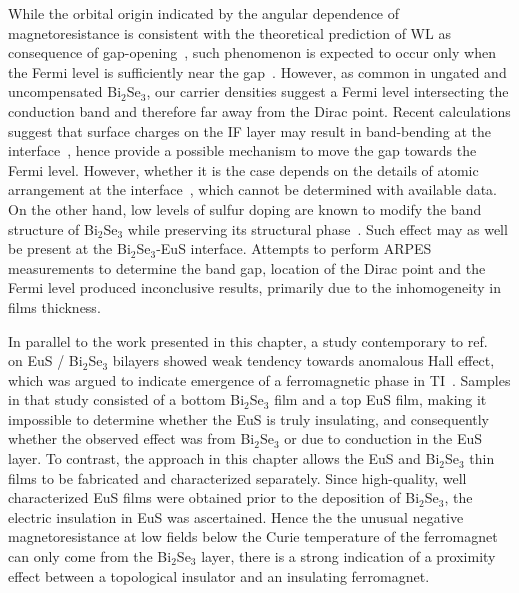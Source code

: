 While the orbital origin indicated by the angular dependence of magnetoresistance is consistent with the theoretical prediction of WL as consequence of gap-opening~\cite{WL_WAL_competition, WL_Glazman, WL_bulk_Lu, QAH_TI_Yu}, such phenomenon is expected to occur only when the Fermi level is sufficiently near the gap~\cite{WL_WAL_competition, WL_Glazman, WL_bulk_Lu}. However, as common in ungated and uncompensated Bi$_2$Se$_3$, our carrier densities suggest a Fermi level intersecting the conduction band and therefore far away from the Dirac point. Recent calculations suggest that surface charges on the IF layer may result in band-bending at the interface~\cite{MnSe}, hence provide a possible mechanism to move the gap towards the Fermi level. However, whether it is the case depends on the details of atomic arrangement at the interface~\cite{xiaoliang}, which cannot be determined with available data. On the other hand, low levels of sulfur doping are known to modify the band structure of Bi$_2$Se$_3$ while preserving its structural phase~\cite{Bi2Se3S, BiSeS}. Such effect may as well be present at the Bi$_2$Se$_3$-EuS interface. Attempts to perform ARPES measurements to determine the band gap, location of the Dirac point and the Fermi level produced inconclusive results, primarily due to the inhomogeneity in films thickness.

In parallel to the work presented in this chapter, a study contemporary to ref.~\cite{bilayer2014} on EuS / Bi$_2$Se$_3$ bilayers showed weak tendency towards anomalous Hall effect, which was argued to indicate emergence of a ferromagnetic phase in TI~\cite{Moodera2013}. Samples in that study consisted of a bottom Bi$_2$Se$_3$ film and a top EuS film, making it impossible to determine whether the EuS is truly insulating, and consequently whether the observed effect was from Bi$_2$Se$_3$ or due to conduction in the EuS layer. To contrast, the approach in this chapter allows the EuS and Bi$_2$Se$_3$ thin films to be fabricated and characterized separately. Since high-quality, well characterized EuS films were obtained prior to the deposition of Bi$_2$Se$_3$, the electric insulation in EuS was ascertained. Hence the the unusual negative magnetoresistance at low fields below the Curie temperature of the ferromagnet can only come from the Bi$_2$Se$_3$ layer, there is a strong indication of a proximity effect between a topological insulator and an insulating ferromagnet.